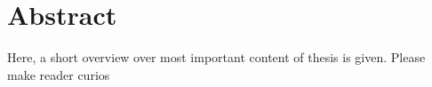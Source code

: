 \section*{Abstract}

Here, a short overview over most important content of thesis is given. Please make reader curios
